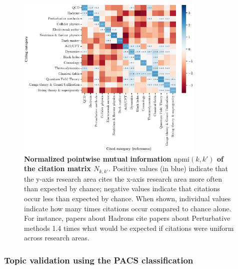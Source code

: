 \documentclass{article}
\begin{document}
\begin{figure}[H]
    \centering
    \includegraphics[width=0.8\textwidth]{plots/topic_citation_matrix.eps}
    \caption{\textbf{Normalized pointwise mutual information $\mathrm{npmi}(k,k')$ of the citation matrix $N_{k,k'}$}. Positive values (in blue) indicate that the y-axis research area cites the x-axis research area more often than expected by chance; negative values indicate that citations occur less than expected by chance. When shown, individual values indicate how many times citations occur compared to chance alone. For instance, papers about Hadrons cite papers about Perturbative methods 1.4 times what would be expected if citations were uniform across research areas.}
    \label{fig:topic_citation_matrix}
\end{figure}

\subsubsection{\label{appendix:pacs_validation}Topic validation using the PACS classification}
\end{document}

